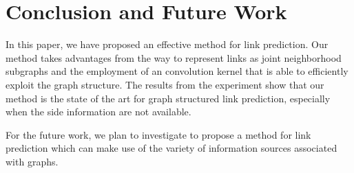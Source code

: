 \documentclass[runningheads,a4paper]{llncs}
\begin{document}
\section{Conclusion and Future Work}
In this paper, we have proposed an effective method for link prediction. Our method takes advantages from the way to represent links as joint neighborhood subgraphs and the employment of an convolution kernel that is able to efficiently exploit the graph structure. The results from the experiment show that our method is the state of the art for graph structured link prediction, especially when the side information are not available.

For the future work, we plan to investigate to propose a method for link prediction which can make use of the variety of information sources associated with graphs.
\end{document}
